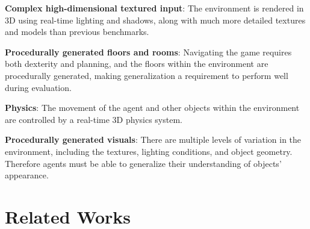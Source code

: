 \documentclass[conference]{IEEEtran}
\begin{document}
\textbf{Complex high-dimensional textured input}: The environment is rendered in 3D using real-time lighting and shadows, along with much more detailed textures and models than previous benchmarks. 

\textbf{Procedurally generated floors and rooms}: Navigating the game requires both dexterity and planning, and the floors within the environment are procedurally generated, making generalization a requirement to perform well during evaluation. 

\textbf{Physics}: The movement of the agent and other objects within the environment are controlled by a real-time 3D physics system.

\textbf{Procedurally generated visuals}: There are multiple levels of variation in the environment, including the textures, lighting conditions, and object geometry. Therefore agents must be able to generalize their understanding of objects’ appearance.

\section{Related Works}
\end{document}
